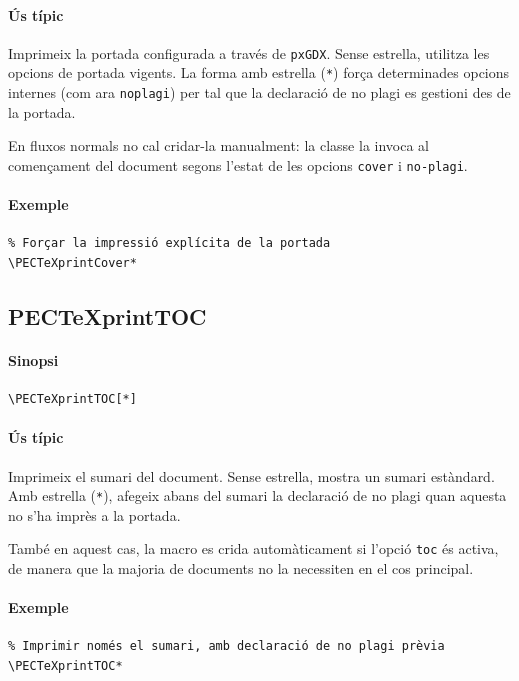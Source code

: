 \documentclass[default]{P3CTeX}
\begin{document}
\paragraph*{Ús típic}
Imprimeix la portada configurada a través de \texttt{pxGDX}. Sense
estrella, utilitza les opcions de portada vigents. La forma amb estrella
(\texttt{*}) força determinades opcions internes (com ara \texttt{noplagi})
per tal que la declaració de no plagi es gestioni des de la portada.

En fluxos normals no cal cridar-la manualment: la classe la invoca al
començament del document segons l'estat de les opcions \texttt{cover} i
\texttt{no-plagi}.

\paragraph*{Exemple}
\begin{verbatim}
% Forçar la impressió explícita de la portada
\PECTeXprintCover*
\end{verbatim}

\subsection{PECTeXprintTOC}

\paragraph*{Sinopsi}
\begin{verbatim}
\PECTeXprintTOC[*]
\end{verbatim}

\paragraph*{Ús típic}
Imprimeix el sumari del document. Sense estrella, mostra un sumari
estàndard. Amb estrella (\texttt{*}), afegeix abans del sumari la
declaració de no plagi quan aquesta no s'ha imprès a la portada.

També en aquest cas, la macro es crida automàticament si l'opció
\texttt{toc} és activa, de manera que la majoria de documents no la
necessiten en el cos principal.

\paragraph*{Exemple}
\begin{verbatim}
% Imprimir només el sumari, amb declaració de no plagi prèvia
\PECTeXprintTOC*
\end{verbatim}
\end{document}
